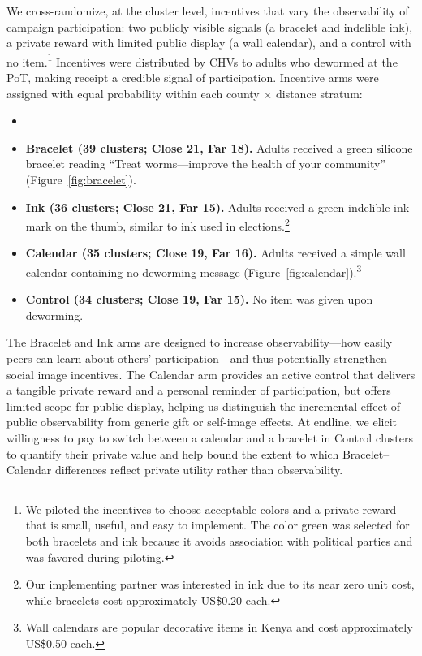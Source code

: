 We cross-randomize, at the cluster level, incentives that vary the observability of campaign participation:
two publicly visible signals (a bracelet and indelible ink), a private reward with limited public display (a wall calendar), and a control with no item.\footnote{We piloted the incentives to choose acceptable colors and a private reward that is small, useful, and easy to implement. The color green was selected for both bracelets and ink because it avoids association with political parties and was favored during piloting.} Incentives were distributed by CHVs to adults who dewormed at the PoT, making receipt a credible signal of participation. Incentive arms were assigned with equal probability within each county $\times$ distance stratum:

\begin{itemize}  
\item[] \textbf{}
\item \textbf{Bracelet (39 clusters; Close 21, Far 18).}
  Adults received a green silicone bracelet reading ``Treat worms---improve the health of your community'' (Figure~\ref{fig:bracelet}).

  \item \textbf{Ink (36 clusters; Close 21, Far 15).}
  Adults received a green indelible ink mark on the thumb, similar to ink used in elections.\footnote{Our implementing partner was interested in ink due to its near zero unit cost, while bracelets cost approximately US\$0.20 each.}

  \item \textbf{Calendar (35 clusters; Close 19, Far 16).}
  Adults received a simple wall calendar containing no deworming message (Figure~\ref{fig:calendar}).\footnote{Wall calendars are popular decorative items in Kenya and cost approximately US\$0.50 each.}

  \item \textbf{Control (34 clusters; Close 19, Far 15).}
  No item was given upon deworming. \\
\end{itemize}

The Bracelet and Ink arms are designed to increase observability---how easily peers can learn about others' participation---and thus potentially strengthen social image incentives. The Calendar arm provides an active control that delivers a tangible private reward and a personal reminder of participation, but offers limited scope for public display, helping us distinguish the incremental effect of public observability from generic gift or self-image effects. At endline, we elicit willingness to pay to switch between a calendar and a bracelet in Control clusters to quantify their private value and help bound the extent to which Bracelet–Calendar differences reflect private utility rather than observability.

